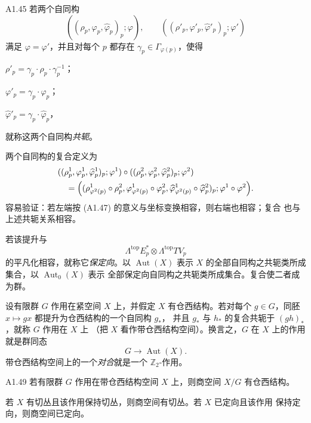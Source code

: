 \begin{definition}{A1.45}
若两个自同构
\[
 ((\rho_p,\varphi_p,\widehat\varphi_p)_p;\varphi),
 \qquad
 ((\rho'_p,\varphi'_p,\widehat\varphi'_p)_p;\varphi')
\]
满足 $\varphi=\varphi'$，并且对每个 $p$ 都存在
$\gamma_p\in\Gamma_{\varphi(p)}$，使得
\begin{description}[style=multiline,leftmargin=7.2em,labelwidth=6.5em]
\item[\textup{(A1.48.1)}]
$\rho'_p=\gamma_p\cdot\rho_p\cdot\gamma_p^{-1}$；
\item[\textup{(A1.48.2)}]
$\varphi'_p=\gamma_p\cdot\varphi_p$；
\item[\textup{(A1.48.3)}]
$\widehat\varphi'_p=\gamma_p\cdot\widehat\varphi_p$，
\end{description}
就称这两个自同构\emph{共轭}。
\end{definition}

两个自同构的复合定义为
\begin{align*}
 &((\rho_p^1,\varphi_p^1,\widehat\varphi_p^1)_p;\varphi^1)
 \circ
 ((\rho_p^2,\varphi_p^2,\widehat\varphi_p^2)_p;\varphi^2)
 \\
 &\quad=
 \Bigl((
 \rho_{\varphi^2(p)}^1\circ\rho_p^2,
 \varphi_{\varphi^2(p)}^1\circ\varphi_p^2,
 \widehat\varphi_{\varphi^2(p)}^1\circ\widehat\varphi_p^2
 )_p;
 \varphi^1\circ\varphi^2\Bigr).
\end{align*}
容易验证：若左端按 (A1.47) 的意义与坐标变换相容，则右端也相容；复合
也与上述共轭关系相容。

若该提升与
\[
 \Lambda^{\mathrm{top}}E_p^*\otimes\Lambda^{\mathrm{top}}TV_p
\]
的平凡化相容，就称它\emph{保定向}。以 $\operatorname{Aut}(X)$ 表示
$X$ 的全部自同构之共轭类所成集合，以 $\operatorname{Aut}_0(X)$ 表示
全部保定向自同构之共轭类所成集合。复合使二者成为群。

设有限群 $G$ 作用在紧空间 $X$ 上，并假定 $X$ 有仓西结构。若对每个
$g\in G$，同胚 $x\mapsto gx$ 都提升为仓西结构的一个自同构 $g_*$，
并且 $g_*$ 与 $h_*$ 的复合共轭于 $(gh)_*$，就称 $G$ 作用在 $X$ 上
（把 $X$ 看作带仓西结构空间）。换言之，$G$ 在 $X$ 上的作用就是群同态
\[
 G\longrightarrow\operatorname{Aut}(X).
\]
带仓西结构空间上的一个\emph{对合}就是一个 $\mathbb Z_2$-作用。

\begin{lemma}{A1.49}\label{lem:a1-49}
若有限群 $G$ 作用在带仓西结构空间 $X$ 上，则商空间 $X/G$ 有仓西结构。

若 $X$ 有切丛且该作用保持切丛，则商空间有切丛。若 $X$ 已定向且该作用
保持定向，则商空间已定向。
\end{lemma}

